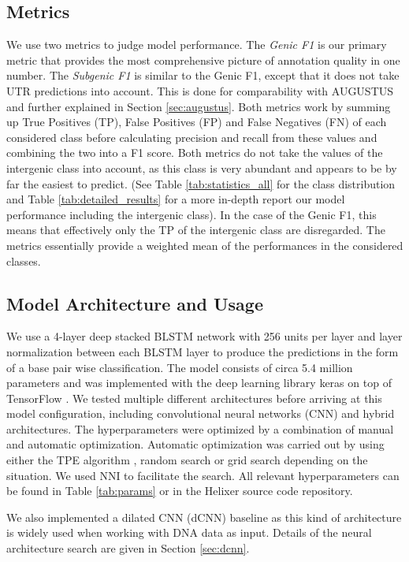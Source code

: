\documentclass{bioinfo}
\begin{document}
\begin{methods}
\subsection{Metrics}
We use two metrics to judge model performance. The {\it Genic F1} is our primary metric that provides the most comprehensive picture of annotation quality in one number. The {\it Subgenic F1} is similar to the Genic F1, except that it does not take UTR predictions into account. This is done for comparability with AUGUSTUS and further explained in Section \ref{sec:augustus}. Both metrics work by summing up True Positives (TP), False Positives (FP) and False Negatives (FN) of each considered class before calculating precision and recall from these values and combining the two into a F1 score. Both metrics do not take the values of the intergenic class into account, as this class is very abundant and appears to be by far the easiest to predict. (See Table \ref{tab:statistics_all} for the class distribution and Table \ref{tab:detailed_results} for a more in-depth report our model performance including the intergenic class). In the case of the Genic F1, this means that effectively only the TP of the intergenic class are disregarded. The metrics essentially provide a weighted mean of the performances in the considered classes. 

	
\subsection{Model Architecture and Usage}
\label{sec:model}
We use a 4-layer deep stacked BLSTM network with 256 units per layer and layer normalization \citep{ba2016layer} between each BLSTM layer to produce the predictions in the form of a base pair wise classification. The model consists of circa 5.4 million parameters and was implemented with the deep learning library keras \citep{chollet2015keras} on top of TensorFlow \citep{abadi2016tensorflow}. We tested multiple different architectures before arriving at this model configuration, including convolutional neural networks (CNN) and hybrid architectures. The hyperparameters were optimized by a combination of manual and automatic optimization. Automatic optimization was carried out by using either the TPE algorithm \citep{bergstra2011algorithms}, random search or grid search depending on the situation. We used NNI \citep{nni2019} to facilitate the search. All relevant hyperparameters can be found in Table \ref{tab:params} or in the Helixer source code repository. 

We also implemented a dilated CNN (dCNN) baseline as this kind of architecture is widely used when working with DNA data as input. Details of the neural architecture search are given in Section \ref{sec:dcnn}.
	

\end{methods}
\end{document}
